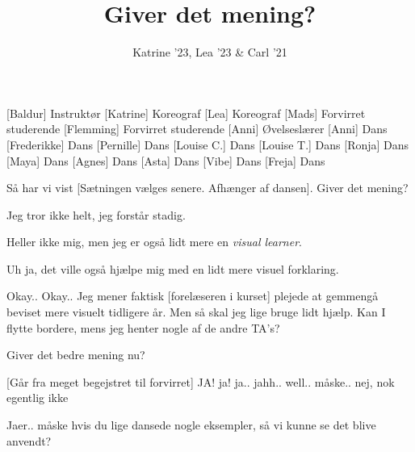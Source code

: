 \documentclass[a4paper,11pt]{article}
\title{Giver det mening?}
\author{Katrine '23, Lea '23 \& Carl '21}
\begin{document}
\maketitle

\begin{roles}
[Baldur] Instruktør
[Katrine] Koreograf
[Lea] Koreograf
[Mads] Forvirret studerende
[Flemming] Forvirret studerende
[Anni] Øvelseslærer
[Anni] Dans
[Frederikke] Dans
[Pernille] Dans
[Louise C.] Dans
[Louise T.] Dans
[Ronja] Dans
[Maya] Dans
[Agnes] Dans
[Asta] Dans
[Vibe] Dans
[Freja] Dans
\end{roles}

\begin{sketch}

 Så har vi vist [Sætningen vælges senere. Afhænger af dansen]. Giver det mening? 


 Jeg tror ikke helt, jeg forstår stadig. 

 Heller ikke mig, men jeg er også lidt mere en \textit{visual learner}.

 Uh ja, det ville også hjælpe mig med en lidt mere visuel forklaring.

 Okay.. Okay.. Jeg mener faktisk [forelæseren i kurset] plejede at gemmengå beviset mere visuelt tidligere år. Men så skal jeg lige bruge lidt hjælp. Kan I flytte bordere, mens jeg henter nogle af de andre TA's?




 Giver det bedre mening nu?

[Går fra meget begejstret til forvirret] JA! ja! ja.. jahh.. well.. måske.. nej, nok egentlig ikke

 Jaer.. måske hvis du lige dansede nogle eksempler, så vi kunne se det blive anvendt?
\end{sketch}
\end{document}
